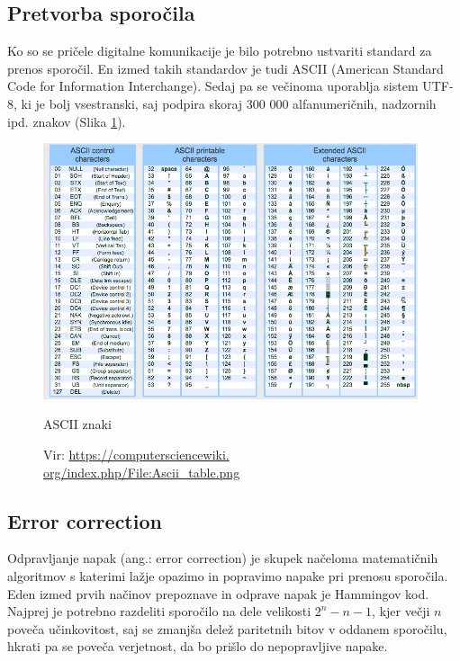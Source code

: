 \documentclass[12pt]{article}
\begin{document}
    \subsection{Pretvorba sporočila} 
        Ko so se pričele digitalne komunikacije je bilo potrebno ustvariti
        standard za prenos sporočil. En izmed takih standardov je tudi ASCII
        (American Standard Code for Information Interchange). Sedaj pa se
        večinoma uporablja sistem UTF-8, ki je bolj vsestranski, saj podpira
        skoraj 300 000 alfanumeričnih, nadzornih ipd. znakov 
        (Slika \ref{fig:tabelaZnakov}).
        \begin{figure}[h!]
            \begin{center}
                \includegraphics[width=11cm, keepaspectratio]
                {slike/Ascii_table-572996368.png}
                \caption{ASCII znaki}
                \caption*{\footnotesize Vir: \url{https://computersciencewiki.
                org/index.php/File:Ascii_table.png}}
                \label{fig:tabelaZnakov}
            \end{center}
        \end{figure}
    \subsection{Error correction}
        Odpravljanje napak (ang.: error correction) je skupek načeloma 
        matematičnih algoritmov s katerimi lažje opazimo in popravimo napake pri
        prenosu sporočila.
        Eden izmed prvih načinov prepoznave in odprave napak je Hammingov kod. 
        Najprej je potrebno razdeliti sporočilo na dele velikosti $2^n - n - 1$,
        kjer večji $n$ poveča učinkovitost, saj se zmanjša delež paritetnih
        bitov v oddanem sporočilu, hkrati pa se poveča verjetnost, da bo prišlo
        do nepopravljive napake.
\end{document}
